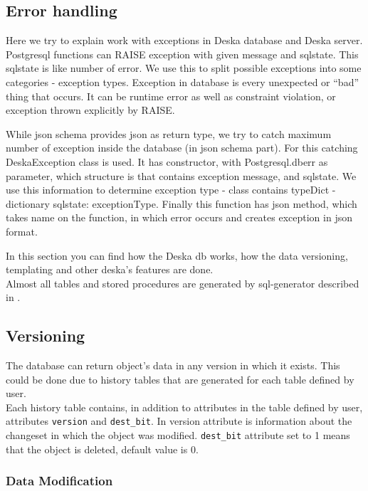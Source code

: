 \documentclass[deska]{subfiles}
\begin{document}
\subsection{Error handling}
Here we try to explain work with exceptions in Deska database and Deska server. Postgresql functions can RAISE exception with given message and sqlstate.
This sqlstate is like number of error. We use this to split possible exceptions into some categories - exception types. Exception in database is
every unexpected or “bad” thing that occurs. It can be runtime error as well as constraint violation, or exception thrown explicitly by RAISE.

While json schema provides json as return type, we try to catch maximum number of exception inside the database (in
json schema part).
For this catching DeskaException class is used. It has constructor, with Postgresql.dberr as parameter, which structure is that contains exception
message, and sqlstate. We use this information to determine exception type - class contains typeDict - dictionary {sqlstate: exceptionType}.
Finally this function has json method, which takes name on the function, in which error occurs and creates exception in json format.

\label{sec:deska-db}

In this section you can find how the Deska db works, how the data versioning, templating and other deska's features are done.\\
Almost all tables and stored procedures are generated by sql-generator described in .

\subsection{Versioning}
\label{sec:versioning}

The database can return object's data in any version in which it exists. This could be done due to history tables that are generated for each table defined by user.\\
Each history table contains, in addition to attributes in the table defined by user, attributes {\tt version} and {\tt dest\_bit}. In version attribute is information about the changeset in which the object was modified. {\tt dest\_bit} attribute set to 1 means that the object is deleted, default value is 0.\\

\subsubsection{Data Modification}
\end{document}
